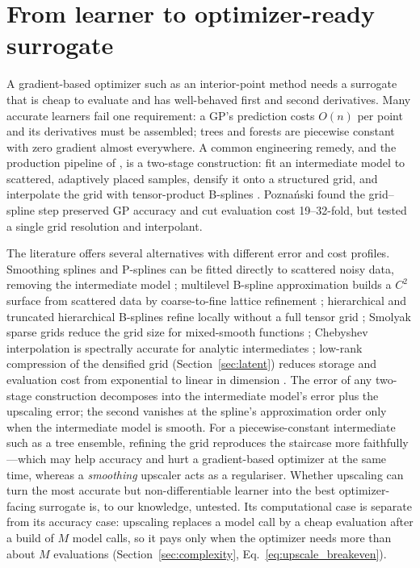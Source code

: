 \section{From learner to optimizer-ready surrogate}
\label{sec:upscaling}

A gradient-based optimizer such as an interior-point method \cite{wachter2006implementation} needs a surrogate that is
cheap to evaluate and has well-behaved first and second derivatives. Many accurate learners fail one requirement: a
GP's prediction costs $O(n)$ per point and its derivatives must be assembled; trees and forests are piecewise constant
with zero gradient almost everywhere. A common engineering remedy, and the production pipeline of \cite[Sec.~14.3]{poznanski2026towards}, is a two-stage
construction: fit an intermediate model to scattered, adaptively placed samples, densify it onto a structured grid, and
interpolate the grid with tensor-product B-splines \cite{deboor2001practical}. Pozna\'nski \cite[App.~G]{poznanski2026towards} found the grid--spline step
preserved GP accuracy and cut evaluation cost 19--32-fold, but tested a single grid resolution and interpolant.

The literature offers several alternatives with different error and cost profiles. Smoothing splines and P-splines can
be fitted directly to scattered noisy data, removing the intermediate model
\cite{eilers1996flexible,wahba1990spline,wood2003thin}; multilevel B-spline approximation builds a $C^2$ surface from
scattered data by coarse-to-fine lattice refinement \cite{lee1997scattered}; hierarchical and truncated hierarchical
B-splines refine locally without a full tensor grid \cite{forsey1988hierarchical,giannelli2012thb}; Smolyak sparse grids
reduce the grid size for mixed-smooth functions \cite{smolyak1963quadrature,bungartz2004sparse}; Chebyshev
interpolation is spectrally accurate for analytic intermediates \cite{trefethen2013approximation}; low-rank compression
of the densified grid (Section~\ref{sec:latent}) reduces storage and evaluation cost from exponential to linear in
dimension \cite{minster2020randomized,oseledets2011tensor}. The error of any two-stage construction decomposes into the
intermediate model's error plus the upscaling error; the second vanishes at the spline's approximation order only when
the intermediate model is smooth. For a piecewise-constant intermediate such as a tree ensemble, refining the grid
reproduces the staircase more faithfully---which may help accuracy and hurt a gradient-based optimizer at the same time,
whereas a \emph{smoothing} upscaler acts as a regulariser. Whether upscaling can turn the most accurate but
non-differentiable learner into the best optimizer-facing surrogate is, to our knowledge, untested.
Its computational case is separate from its accuracy case: upscaling replaces a model call by a cheap evaluation after
a build of $M$ model calls, so it pays only when the optimizer needs more than about $M$ evaluations
(Section~\ref{sec:complexity}, Eq.~\eqref{eq:upscale_breakeven}).
